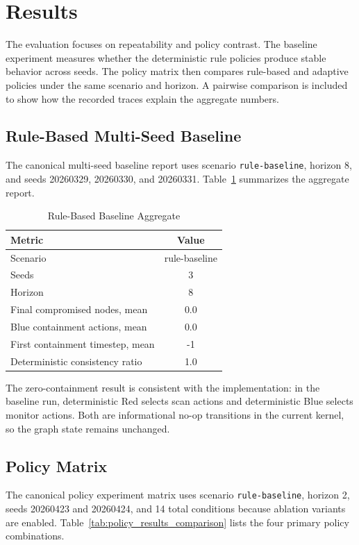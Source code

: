 \documentclass[conference]{IEEEtran}
\begin{document}
\section{Results}
The evaluation focuses on repeatability and policy contrast. The baseline experiment measures whether the deterministic rule policies produce stable behavior across seeds. The policy matrix then compares rule-based and adaptive policies under the same scenario and horizon. A pairwise comparison is included to show how the recorded traces explain the aggregate numbers.

\subsection{Rule-Based Multi-Seed Baseline}
The canonical multi-seed baseline report uses scenario \texttt{rule-baseline}, horizon 8, and seeds 20260329, 20260330, and 20260331. Table~\ref{tab:baseline_results} summarizes the aggregate report.

\begin{table}[H]
\centering
\caption{Rule-Based Baseline Aggregate}
\label{tab:baseline_results}
\begin{tabular}{|l|c|}
\hline
\textbf{Metric} & \textbf{Value} \\
\hline
Scenario & rule-baseline \\
\hline
Seeds & 3 \\
\hline
Horizon & 8 \\
\hline
Final compromised nodes, mean & 0.0 \\
\hline
Blue containment actions, mean & 0.0 \\
\hline
First containment timestep, mean & -1 \\
\hline
Deterministic consistency ratio & 1.0 \\
\hline
\end{tabular}
\end{table}

The zero-containment result is consistent with the implementation: in the baseline run, deterministic Red selects scan actions and deterministic Blue selects monitor actions. Both are informational no-op transitions in the current kernel, so the graph state remains unchanged.

\subsection{Policy Matrix}
The canonical policy experiment matrix uses scenario \texttt{rule-baseline}, horizon 2, seeds 20260423 and 20260424, and 14 total conditions because ablation variants are enabled. Table~\ref{tab:policy_results_comparison} lists the four primary policy combinations.
\end{document}
